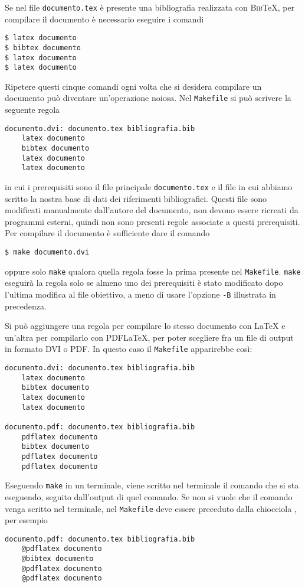 Se nel file \texttt{documento.tex} è presente una bibliografia realizzata con
\textsc{Bib}\TeX, per compilare il documento è necessario eseguire i comandi
\begin{verbatim}
$ latex documento
$ bibtex documento
$ latex documento
$ latex documento
\end{verbatim}
Ripetere questi cinque comandi ogni volta che si desidera compilare un documento
può diventare un'operazione noiosa.  Nel \texttt{Makefile} si può scrivere la
seguente regola
\begin{lstlisting}
documento.dvi: documento.tex bibliografia.bib
	latex documento
	bibtex documento
	latex documento
	latex documento
\end{lstlisting}
in cui i prerequisiti sono il file principale \texttt{documento.tex} e il file
in cui abbiamo scritto la nostra base di dati dei riferimenti bibliografici.
Questi file sono modificati manualmente dall'autore del documento, non devono
essere ricreati da programmi esterni, quindi non sono presenti regole associate
a questi prerequisiti.  Per compilare il documento è sufficiente dare il comando
\begin{verbatim}
$ make documento.dvi
\end{verbatim}
oppure solo \texttt{make} qualora quella regola fosse la prima presente nel
\texttt{Makefile}.  \texttt{make} eseguirà la regola solo se almeno uno dei
prerequisiti è stato modificato dopo l'ultima modifica al file obiettivo, a meno
di usare l'opzione \texttt{-B} illustrata in precedenza.

Si può aggiungere una regola per compilare lo stesso documento con \LaTeX{}
e un'altra per compilarlo con \textsc{PDF}\LaTeX, per poter scegliere fra un
file di output in formato \textsc{DVI} o \textsc{PDF}.  In questo caso il
\texttt{Makefile} apparirebbe così:
\begin{lstlisting}[caption={La prima regola permette di compilare un documento con
\LaTeX, la seconda con \textsc{PDF}\LaTeX.},label=lst:dvi-pdf]
documento.dvi: documento.tex bibliografia.bib
	latex documento
	bibtex documento
	latex documento
	latex documento

documento.pdf: documento.tex bibliografia.bib
	pdflatex documento
	bibtex documento
	pdflatex documento
	pdflatex documento
\end{lstlisting}

Eseguendo \texttt{make} in un terminale, viene scritto nel terminale il comando
che si sta eseguendo, seguito dall'output di quel comando.  Se non si vuole che
il comando venga scritto nel terminale, nel \texttt{Makefile} deve essere
preceduto dalla chiocciola \texttt{\@}, per esempio
\begin{lstlisting}
documento.pdf: documento.tex bibliografia.bib
	@pdflatex documento
	@bibtex documento
	@pdflatex documento
	@pdflatex documento
\end{lstlisting}

